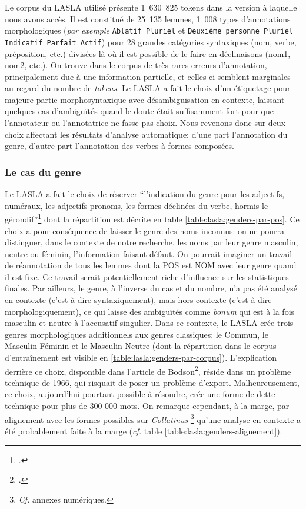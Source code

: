 Le corpus du LASLA utilisé présente 1~630~825 tokens dans la version à laquelle nous avons accès. Il est constitué de 25~135 lemmes, 1~008 types d'annotations morphologiques (\textit{par exemple}  \texttt{Ablatif Pluriel} et \texttt{Deuxième personne Pluriel Indicatif Parfait Actif}) pour 28 grandes catégories syntaxiques (nom, verbe, préposition, etc.) divisées là où il est possible de le faire en déclinaisons (nom1, nom2, etc.). On trouve dans le corpus de très rares erreurs d'annotation, principalement due à une information partielle, et celles-ci semblent marginales au regard du nombre de \textit{tokens}. Le LASLA a fait le choix d'un étiquetage pour majeure partie morphosyntaxique avec désambiguïsation en contexte, laissant quelques cas d'ambiguïtés quand le doute était suffisamment fort pour que l'annotateur ou l'annotatrice ne fasse pas choix. Nous revenons donc sur deux choix affectant les résultats d'analyse automatique: d'une part l'annotation du genre, d'autre part l'annotation des verbes à formes composées.

\subsubsection{Le cas du genre}

Le LASLA a fait le choix de réserver \enquote{l'indication du genre pour les adjectifs, numéraux, les adjectifs-pronoms, les formes déclinées du verbe, hormis le gérondif}\footcite[p.~27]{BodsonCodification1966} dont la répartition est décrite en table \ref{table:lasla:genders-par-pos}. Ce choix a pour conséquence de laisser le genre des noms inconnus: on ne pourra distinguer, dans le contexte de notre recherche, les noms par leur genre masculin, neutre ou féminin, l'information faisant défaut. On pourrait imaginer un travail de réannotation de tous les lemmes dont la POS est NOM avec leur genre quand il est fixe. Ce travail serait potentiellement riche d'influence sur les statistiques finales. Par ailleurs, le genre, à l'inverse du cas et du nombre, n'a pas été analysé en contexte (c'est-à-dire syntaxiquement), mais hors contexte (c'est-à-dire morphologiquement), ce qui laisse des ambiguïtés comme \textit{bonum} qui est à la fois masculin et neutre à l'accusatif singulier. Dans ce contexte, le LASLA crée trois genres morphologiques additionnels aux genres classiques: le Commun, le Masculin-Féminin et le Masculin-Neutre (dont la répartition dans le corpus d'entraînement est visible en \ref{table:lasla:genders-par-corpus}). L'explication derrière ce choix, disponible dans l'article de Bodson\footcite{BodsonCodification1966}, réside dans un problème technique de 1966, qui risquait de poser un problème d'export. Malheureusement, ce choix, aujourd'hui pourtant possible à résoudre, crée une forme de dette technique pour plus de 300 000 mots. On remarque cependant, à la marge, par alignement avec les formes possibles sur \textit{Collatinus} \footnote{\textit{Cf.} annexes numériques.} qu'une analyse en contexte a été probablement faite à la marge (\textit{cf.} table \ref{table:lasla:genders-alignement}).

